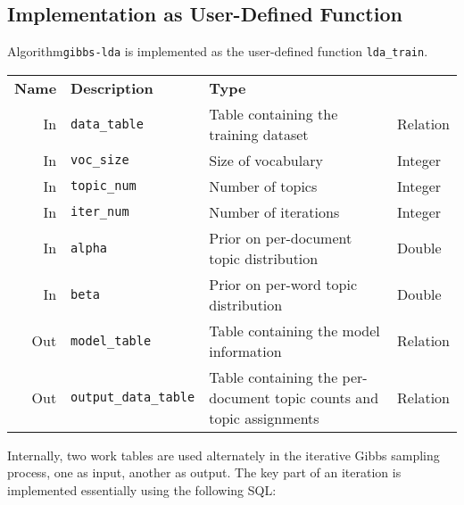 \subsection{Implementation as User-Defined Function}

Algorithm\texttt{gibbs-lda} is implemented as the user-defined function \texttt{lda\_train}.

\begin{center}
    \begin{tabularx}{\textwidth}{rlXl}
        \toprule%
        \textbf{Name} & \textbf{Description} & \textbf{Type}
        \\\otoprule

        In &
        \texttt{data\_table} &
        Table containing the training dataset &
        Relation
        \\\midrule

       In &
        \texttt{voc\_size} &
        Size of vocabulary &
        Integer
        \\\midrule

        In &
        \texttt{topic\_num} &
        Number of topics &
        Integer
        \\\midrule

        In &
        \texttt{iter\_num} &
        Number of iterations &
        Integer
        \\\midrule

        In &
        \texttt{alpha} &
        Prior on per-document topic distribution &
        Double
        \\\midrule

        In &
        \texttt{beta} &
        Prior on per-word topic distribution &
        Double
        \\\midrule

        Out &
        \texttt{model\_table} &
        Table containing the model information &
        Relation
        \\\midrule

        Out &
        \texttt{output\_data\_table} &
        Table containing the per-document topic counts and topic assignments &
        Relation
        \\\bottomrule
     \end{tabularx}
\end{center}

Internally, two work tables are used alternately in the iterative Gibbs sampling process, one as input, another as output. The key part of an iteration is implemented essentially using the following SQL:

